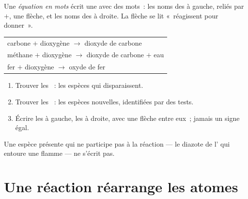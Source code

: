 \begin{definition}\label{def:g7:chemical-reactions:word-equation}
Une \emph{équation en mots} écrit une  avec des mots~: les noms des  à gauche, reliés par $+$,
une flèche, et les noms des  à droite. La flèche se lit
«~réagissent pour donner~».
\end{definition}

\begin{example}\label{ex:g7:chemical-reactions:three}
\begin{center}
\begin{tabular}{l}
carbone $+$ dioxygène $\longrightarrow$ dioxyde de carbone\\[2pt]
méthane $+$ dioxygène $\longrightarrow$ dioxyde de carbone $+$ eau\\[2pt]
fer $+$ dioxygène $\longrightarrow$ oxyde de fer
\end{tabular}
\end{center}
\end{example}

\begin{method}\label{met:g7:chemical-reactions:write}
\begin{enumerate}
  \item Trouver les ~: les espèces qui disparaissent.
  \item Trouver les ~: les espèces nouvelles, identifiées par des
        tests.
  \item Écrire les  à gauche, les  à droite, avec une
        flèche entre eux~; jamais un signe égal.
\end{enumerate}
Une espèce présente qui ne participe pas à la réaction --- le diazote de
l' qui entoure une flamme --- ne s'écrit pas.
\end{method}

\section{Une réaction réarrange les atomes}

